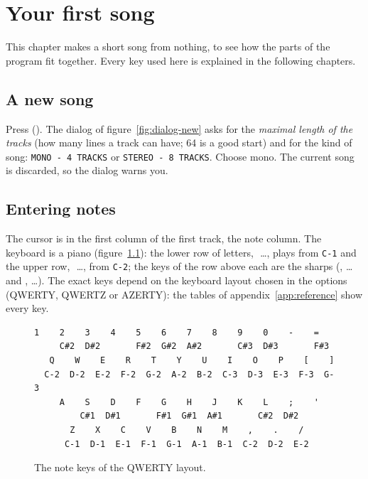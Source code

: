 \chapter{Your first song}\label{ch:tutorial}

This chapter makes a short song from nothing, to see how the parts of the program fit together. Every key used here is
explained in the following chapters.

\section{A new song}

Press  (). The dialog of figure~\ref{fig:dialog-new} asks for the
\emph{maximal length of the tracks} (how many lines a track can have; 64 is a good start) and for the kind of song:
\texttt{MONO - 4 TRACKS} or \texttt{STEREO - 8 TRACKS}. Choose mono. The current song is discarded, so the dialog warns
you.


\section{Entering notes}

The cursor is in the first column of the first track, the note column. The keyboard is a piano
(figure~\ref{fig:notekeys}): the lower row of letters, \,\,\ldots, plays from \texttt{C-1} and the
upper row, \,\,\ldots, from \texttt{C-2}; the keys of the row above each are the sharps
(, \ldots and , \ldots). The exact keys depend on the keyboard layout chosen in the options (QWERTY,
QWERTZ or AZERTY): the tables of appendix~\ref{app:reference} show every key.

\begin{figure}[H]\centering
\begin{lstlisting}[frame=single]
 1    2    3    4    5    6    7    8    9    0    -    =
     C#2  D#2       F#2  G#2  A#2       C#3  D#3       F#3
   Q    W    E    R    T    Y    U    I    O    P    [    ]
  C-2  D-2  E-2  F-2  G-2  A-2  B-2  C-3  D-3  E-3  F-3  G-3
     A    S    D    F    G    H    J    K    L    ;    '
         C#1  D#1       F#1  G#1  A#1       C#2  D#2
       Z    X    C    V    B    N    M    ,    .    /
      C-1  D-1  E-1  F-1  G-1  A-1  B-1  C-2  D-2  E-2
\end{lstlisting}
\caption{The note keys of the QWERTY layout.}\label{fig:notekeys}
\end{figure}


